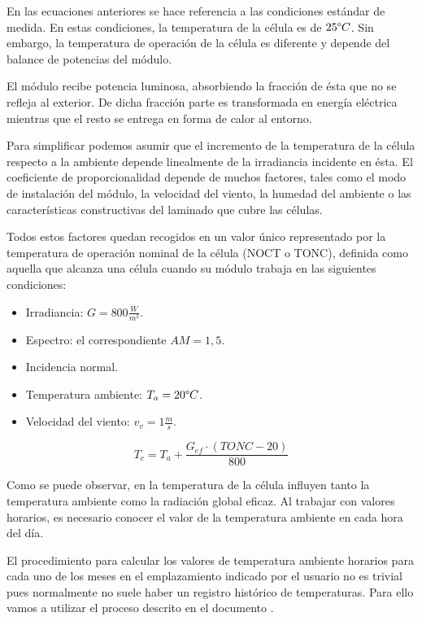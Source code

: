 En las ecuaciones anteriores se hace referencia a las condiciones estándar de medida. En estas condiciones, la temperatura de la célula es de $25\degree C$. Sin embargo, la temperatura de operación de la célula es diferente y depende del balance de potencias del módulo.

El módulo recibe potencia luminosa, absorbiendo la fracción de ésta que no se refleja al exterior. De dicha fracción parte es transformada en energía eléctrica mientras que el resto se entrega en forma de calor al entorno.

Para simplificar podemos asumir que el incremento de la temperatura de la célula respecto a la ambiente depende linealmente de la irradiancia incidente en ésta. El coeficiente de proporcionalidad depende de muchos factores, tales como el modo de instalación del módulo, la velocidad del viento, la humedad del ambiente o las características constructivas del laminado que cubre las células.

Todos estos factores quedan recogidos en un valor único representado por la temperatura de operación nominal de la célula (NOCT o TONC), definida como aquella que alcanza una célula cuando su módulo trabaja en las siguientes condiciones:
\begin{itemize}
\item Irradiancia: $G=800 \frac{W}{m^2}$.
\item Espectro: el correspondiente $AM=1,5$.
\item Incidencia normal.
\item Temperatura ambiente: $T_a = 20 \degree C$.
\item Velocidad del viento:  $ v_v = 1 \frac{m}{s}$.
\end{itemize}

\begin{equation}
\label{eqn_T_c}
T_c = T_a + \frac{G_{ef}\cdot(TONC - 20)}{800}
\end{equation}

Como se puede observar, en la temperatura de la célula influyen tanto la temperatura ambiente como la radiación global eficaz. Al trabajar con valores horarios, es necesario conocer el valor de la temperatura ambiente en cada hora del día.



El procedimiento para calcular los valores de temperatura ambiente horarios para cada uno de los meses en el emplazamiento indicado por el usuario no es trivial pues normalmente no suele haber un registro histórico de temperaturas. Para ello vamos a utilizar el proceso descrito en el documento \cite{temp_paper}.

